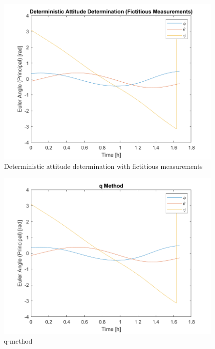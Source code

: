 \begin{figure}[H]
\centering
\includegraphics[scale=0.8]{Images/ps6_problem6_DADFict.png}
\caption{Deterministic attitude determination with fictitious measurements}
\label{fig:Images/ps6_problem6_DADFict}
\end{figure}

\begin{figure}[H]
\centering
\includegraphics[scale=0.8]{Images/ps6_problem6_qMethod.png}
\caption{q-method}
\label{fig:Images/ps6_problem6_qMethod}
\end{figure}

